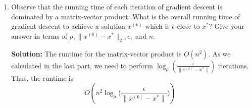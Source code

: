\documentclass{article}
\newcommand{\solution}{\textbf{Solution: }}
\begin{document}
\begin{enumerate}[label=(\alph*)]
    \item Observe that the running time of each iteration of gradient descent is dominated by a matrix-vector product. What is the overall running time of gradient descent to achieve a solution $x^{(k)}$ which is $\epsilon$-close to $x^*$? Give your answer in terms of $\rho, \lVert x^{(0)} - x^*\rVert_2, \epsilon,$ and $n$. 
    \begin{mdframed}
    \solution The runtime for the matrix-vector product is $O(n^2)$. As we calculated in the last part, we need to perform $\log_{\rho}(\frac{\epsilon}{\lVert x^{(0)}-x^*\rVert})$ iterations. Thus, the runtime is
    $$O(n^2\log_{\rho}\bigg(\frac{\epsilon}{\lVert x^{(0)}-x^*\rVert}\bigg))$$
    \end{mdframed}
\end{enumerate}

\newpage 
\end{document}
